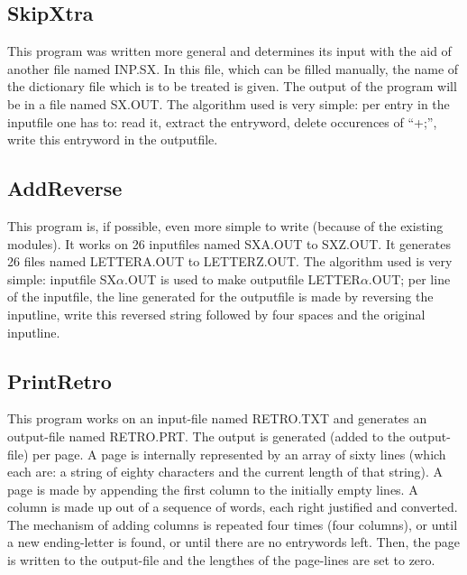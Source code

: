  \subsection{SkipXtra}
  This program was written more general and determines its input with the aid 
  of another file named INP.SX\@. In this file, which can be filled manually, 
  the name of the dictionary file which is to be treated is given. The output 
  of the program will be in a file named SX.OUT\@. The algorithm used is very 
  simple: per entry in the inputfile one has to: read it, extract the entryword,
  delete occurences of ``+;'', write this entryword in the outputfile.
 \subsection{AddReverse}
  This program is, if possible, even more simple to write (because of the 
  existing modules). It works on 26 inputfiles named SXA.OUT to SXZ.OUT\@. 
  It generates 26 files named LETTERA.OUT to LETTERZ.OUT\@. The algorithm used 
  is very simple: inputfile SX$\alpha$.OUT is used to make outputfile 
  LETTER$\alpha$.OUT; per line of the inputfile, the line generated for the 
  outputfile is made by reversing the inputline, write this reversed string 
  followed by four spaces and the original inputline.
 \subsection{PrintRetro}
  This program works on an input-file named RETRO.TXT and generates an 
  output-file named RETRO.PRT\@. The output is generated (added to the 
  output-file) per page. A page is internally represented by an array of sixty
  lines (which each are: a string of eighty characters and the current length 
  of that string). A page is made by appending the first column to the 
  initially empty lines. A column is made up out of a sequence of words, each 
  right justified and converted. The mechanism of adding columns is repeated 
  four times (four columns), or until a new ending-letter is found, or until 
  there are no entrywords left. Then, the page is written to the output-file 
  and the lengthes of the page-lines are set to zero.
  
